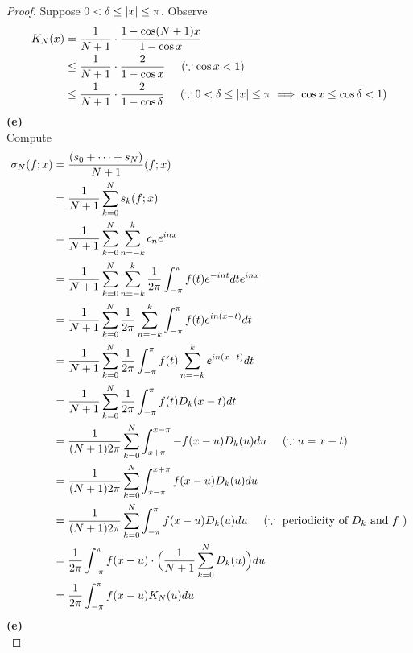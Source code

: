 \documentclass{report}
\begin{document}
\begin{proof}
Suppose $0<\delta\leq \left|x\right|\leq \pi$. Observe
\begin{align*}
K_N(x)&=\frac{1}{N+1}\cdot \frac{1- \cos (N+1)x}{1-\cos x}\\
&\leq  \frac{1}{N+1}\cdot \frac{2}{1 - \cos x}\hspace{0.5cm}(\because \cos x <1)\\
&\leq \frac{1}{N+1}\cdot \frac{2}{1- \cos \delta}\hspace{0.5cm}(\because 0<\delta \leq \left|x\right|\leq \pi \implies \cos x\leq \cos \delta <1 )
\end{align*}
\textbf{(e)}\\

Compute 
\begin{align*}
\sigma_N(f;x)&=\frac{(s_0+ \cdots +s_N)}{N+1}(f;x)\\
&=\frac{1}{N+1}\sum_{k=0}^N s_k(f;x)\\
&=\frac{1}{N+1}\sum_{k=0}^N \sum_{n=-k}^k c_ne^{i nx}\\
&=\frac{1}{N+1}\sum_{k=0}^N \sum_{n=-k}^k \frac{1}{2\pi}\int_{-\pi}^\pi f(t)e^{-i nt}dte^{inx}\\
&=\frac{1}{N+1}\sum_{k=0}^N \frac{1}{2\pi}\sum_{n=-k}^{k}\int_{-\pi}^{\pi}f(t)e^{in(x-t)}dt\\
&=\frac{1}{N+1}\sum_{k=0}^N \frac{1}{2\pi}\int_{-\pi}^{\pi}f(t)\sum_{n=-k}^{k}e^{in(x-t)}dt\\
&=\frac{1}{N+1}\sum_{k=0}^N \frac{1}{2\pi} \int_{-\pi}^{\pi}f(t)D_k(x-t)dt\\
&=\frac{1}{(N+1)2\pi}\sum_{k=0}^N \int^{x-\pi}_{x+\pi} -f(x-u)D_k(u)du\hspace{0.5cm}(\because u=x-t)\\
&=\frac{1}{(N+1)2\pi}\sum_{k=0}^N \int_{x-\pi}^{x+\pi}f(x-u)D_k(u)du\\
&=\frac{1}{(N+1)2\pi}\sum _{k=0}^{N}\int_{-\pi}^{\pi}f(x-u)D_k(u)du\hspace{0.5cm}(\because \text{ periodicity of $D_k$ and $f$ })\\
&=\frac{1}{2\pi}\int_{-\pi}^{\pi}f(x-u)\cdot\Big( \frac{1}{N+1}\sum_{k=0}^N D_k(u)\Big)du\\
&=\frac{1}{2\pi}\int_{-\pi}^{\pi} f(x-u)K_N(u)du
\end{align*}
\textbf{(e)}\\


\end{proof}
\end{document}
